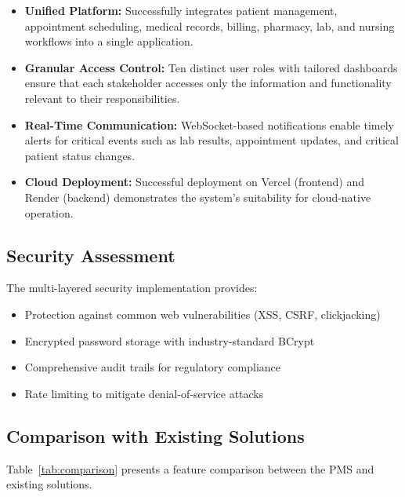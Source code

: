 \documentclass[conference]{IEEEtran}
\begin{document}
\begin{itemize}[leftmargin=*]
  \item \textbf{Unified Platform:} Successfully integrates patient management, appointment scheduling, medical records, billing, pharmacy, lab, and nursing workflows into a single application.
  \item \textbf{Granular Access Control:} Ten distinct user roles with tailored dashboards ensure that each stakeholder accesses only the information and functionality relevant to their responsibilities.
  \item \textbf{Real-Time Communication:} WebSocket-based notifications enable timely alerts for critical events such as lab results, appointment updates, and critical patient status changes.
  \item \textbf{Cloud Deployment:} Successful deployment on Vercel (frontend) and Render (backend) demonstrates the system's suitability for cloud-native operation.
\end{itemize}

\subsection{Security Assessment}
The multi-layered security implementation provides:
\begin{itemize}[leftmargin=*]
  \item Protection against common web vulnerabilities (XSS, CSRF, clickjacking)
  \item Encrypted password storage with industry-standard BCrypt
  \item Comprehensive audit trails for regulatory compliance
  \item Rate limiting to mitigate denial-of-service attacks
\end{itemize}

\subsection{Comparison with Existing Solutions}
Table~\ref{tab:comparison} presents a feature comparison between the PMS and existing solutions.
\end{document}
